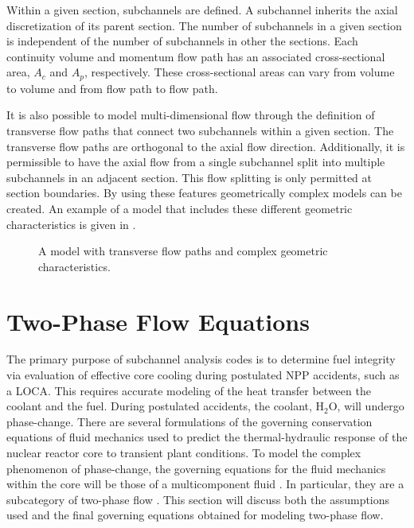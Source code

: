 Within a given section, subchannels are defined.
A subchannel inherits the axial discretization of its parent section.
The number of subchannels in a given section is independent of the number of subchannels in other the sections.
Each continuity volume and momentum flow path has an associated cross-sectional area, $A_{c}$ and $A_{p}$, respectively. 
These cross-sectional areas can vary from volume to volume and from flow path to flow path.

It is also possible to model multi-dimensional flow through the definition of transverse flow paths that connect two subchannels within a given section.
The transverse flow paths are orthogonal to the axial flow direction.
Additionally, it is permissible to have the axial flow from a single subchannel split into multiple subchannels in an adjacent section.
This flow splitting is only permitted at section boundaries.
By using these features geometrically complex models can be created.
An example of a model that includes these different geometric characteristics is given in .

\begin{figure}[ht!]
\centering

\caption{A model with transverse flow paths and complex geometric characteristics.}
\label{fig:complex_geometry}
\end{figure}

\section{Two-Phase Flow Equations}
\label{sect:two_phase_flow}
The primary purpose of subchannel analysis codes is to determine fuel integrity via evaluation of effective core cooling during postulated NPP accidents, such as a LOCA.
This requires accurate modeling of the heat transfer between the coolant and the fuel. 
During postulated accidents, the coolant, H$_2$O, will undergo phase-change.
There are several formulations of the governing conservation equations of fluid mechanics used to predict the thermal-hydraulic response of the nuclear reactor core to transient plant conditions.
To model the complex phenomenon of phase-change, the governing equations for the fluid mechanics within the core will be those of a multicomponent fluid \cite{Drew1998}.
In particular, they are a subcategory of two-phase flow \cite{Todreas2011, Stewart1984, Ishii1984}.
This section will discuss both the assumptions used and the final governing equations obtained for modeling two-phase flow.

